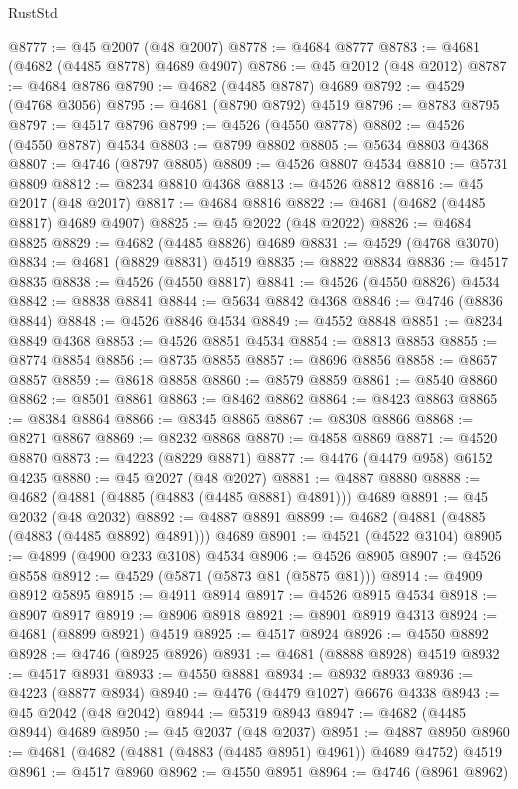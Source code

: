 \begin{lexlean}{RustStd}
\begin{coremodule}
@8777 := @45 @2007 (@48 @2007)
@8778 := @4684 @8777
@8783 := @4681 (@4682 (@4485 @8778) @4689 @4907)
@8786 := @45 @2012 (@48 @2012)
@8787 := @4684 @8786
@8790 := @4682 (@4485 @8787) @4689
@8792 := @4529 (@4768 @3056)
@8795 := @4681 (@8790 @8792) @4519
@8796 := @8783 @8795
@8797 := @4517 @8796
@8799 := @4526 (@4550 @8778)
@8802 := @4526 (@4550 @8787) @4534
@8803 := @8799 @8802
@8805 := @5634 @8803 @4368
@8807 := @4746 (@8797 @8805)
@8809 := @4526 @8807 @4534
@8810 := @5731 @8809
@8812 := @8234 @8810 @4368
@8813 := @4526 @8812
@8816 := @45 @2017 (@48 @2017)
@8817 := @4684 @8816
@8822 := @4681 (@4682 (@4485 @8817) @4689 @4907)
@8825 := @45 @2022 (@48 @2022)
@8826 := @4684 @8825
@8829 := @4682 (@4485 @8826) @4689
@8831 := @4529 (@4768 @3070)
@8834 := @4681 (@8829 @8831) @4519
@8835 := @8822 @8834
@8836 := @4517 @8835
@8838 := @4526 (@4550 @8817)
@8841 := @4526 (@4550 @8826) @4534
@8842 := @8838 @8841
@8844 := @5634 @8842 @4368
@8846 := @4746 (@8836 @8844)
@8848 := @4526 @8846 @4534
@8849 := @4552 @8848
@8851 := @8234 @8849 @4368
@8853 := @4526 @8851 @4534
@8854 := @8813 @8853
@8855 := @8774 @8854
@8856 := @8735 @8855
@8857 := @8696 @8856
@8858 := @8657 @8857
@8859 := @8618 @8858
@8860 := @8579 @8859
@8861 := @8540 @8860
@8862 := @8501 @8861
@8863 := @8462 @8862
@8864 := @8423 @8863
@8865 := @8384 @8864
@8866 := @8345 @8865
@8867 := @8308 @8866
@8868 := @8271 @8867
@8869 := @8232 @8868
@8870 := @4858 @8869
@8871 := @4520 @8870
@8873 := @4223 (@8229 @8871)
@8877 := @4476 (@4479 @958) @6152 @4235
@8880 := @45 @2027 (@48 @2027)
@8881 := @4887 @8880
@8888 := @4682 (@4881 (@4885 (@4883 (@4485 @8881) @4891))) @4689
@8891 := @45 @2032 (@48 @2032)
@8892 := @4887 @8891
@8899 := @4682 (@4881 (@4885 (@4883 (@4485 @8892) @4891))) @4689
@8901 := @4521 (@4522 @3104)
@8905 := @4899 (@4900 @233 @3108) @4534
@8906 := @4526 @8905
@8907 := @4526 @8558
@8912 := @4529 (@5871 (@5873 @81 (@5875 @81)))
@8914 := @4909 @8912 @5895
@8915 := @4911 @8914
@8917 := @4526 @8915 @4534
@8918 := @8907 @8917
@8919 := @8906 @8918
@8921 := @8901 @8919 @4313
@8924 := @4681 (@8899 @8921) @4519
@8925 := @4517 @8924
@8926 := @4550 @8892
@8928 := @4746 (@8925 @8926)
@8931 := @4681 (@8888 @8928) @4519
@8932 := @4517 @8931
@8933 := @4550 @8881
@8934 := @8932 @8933
@8936 := @4223 (@8877 @8934)
@8940 := @4476 (@4479 @1027) @6676 @4338
@8943 := @45 @2042 (@48 @2042)
@8944 := @5319 @8943
@8947 := @4682 (@4485 @8944) @4689
@8950 := @45 @2037 (@48 @2037)
@8951 := @4887 @8950
@8960 := @4681 (@4682 (@4881 (@4883 (@4485 @8951) @4961)) @4689 @4752) @4519
@8961 := @4517 @8960
@8962 := @4550 @8951
@8964 := @4746 (@8961 @8962)

\end{coremodule}
\end{lexlean}
